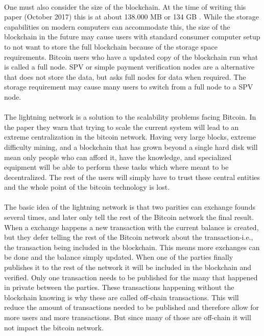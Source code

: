 \documentclass[informationsecurity]{gucmasterproject}
\begin{document}
\paragraph{}
One must also consider the size of the blockchain. At the time of writing this paper (October 2017) this is at about 138.000 MB or 134 GB \cite{blockchain_size}. While the storage capabilities on modern computers can accommodate this, the size of the blockchain in the future may cause users with standard consumer computer setup to not want to store the full blockchain because of the storage space requirements. Bitcoin users who have a updated copy of the blockchain run what is called a full node. SPV or simple payment verification nodes are a alternative that does not store the data, but asks full nodes for data when required. The storage requirement may cause many users to switch from a full node to a SPV node. 

\paragraph{}
The lightning network is a solution to the scalability problems facing Bitcoin\cite{poon2015bitcoin}.
In the paper they warn that trying to scale the current system will lead to an extreme centralization in the bitcoin network.
Having very large blocks, extreme difficulty mining, and a blockchain that has grown beyond a single hard disk will mean only people who can afford it, have the knowledge, and specialized equipment will be able to perform these tasks which where meant to be decentralized. The rest of the users will simply have to trust these central entities and the whole point of the bitcoin technology is lost.

\paragraph{}
The basic idea of the lightning network is that two parities can exchange founds several times, and later only tell the rest of the Bitcoin network the final result.
When a exchange happens a new transaction with the current balance is created, but they defer telling the rest of the Bitcoin network about the transaction-i.e., the transaction being included in the blockchain. This means more exchanges can be done and the balance simply updated.
When one of the parties finally publishes it to the rest of the network it will be included in the blockchain and verified. Only one transaction needs to be published for the many that happened in private between the parties. These transactions happening without the blockchain knowing is why these are called off-chain transactions. This will reduce the amount of transactions needed to be published and therefore allow for more users and more transactions. But since many of those are off-chain it will not impact the bitcoin network.
\end{document}
